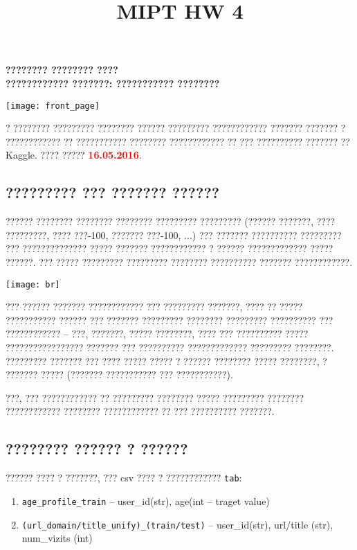 \documentclass[a4paper, 12pt]{article}
\author{}
\date{}
\title{MIPT HW 4}
\begin{document}
  \begin{center}
    \textsc{\textbf{
    	{\Large ???????? ???????? ???? \\
        \vspace{0.5cm}
    	???????????? ???????: ??????????? ????????}}}
  \end{center}

\begin{center}
	\texttt{[image: front\_page]}
\end{center}

? ???????? ????????? ???????? ?????? ????????? ???????????? ??????? ??????? ? ???????????? ?? ??????????? ???????? ???????????? ?? ??? ?????????? ??????? ?? Kaggle. ???? ????? \textbf{\textcolor{red}{16.05.2016}}.

\subsection*{????????? ??? ??????? ??????}

?????? ???????? ???????? ???????? ????????? ????????? (?????? ???????, ???? ?????????, ???? ???-100, ??????? ???-100, ...) ??? ??????? ?????????? ????????? ??? ?????????????? ????? ??????? ???????????? ? ?????? ????????????? ????? ??????. ??? ????? ????????? ????????? ???????? ?????????? ??????? ????????????. 

\begin{center}
	\texttt{[image: br]}
\end{center}

??? ?????? ??????? ???????????? ??? ????????? ???????, ???? ?? ????? ??????????? ?????? ??? ??????? ????????? ???????? ????????? ?????????? ??? ???????????? -- ???, ???????, ????? ????????, ???? ??? ?????????? ????? ????????????????? ??????? ??? ?????????? ????????????? ????????? ????????. ????????? ??????? ??? ???? ????? ????? ? ?????? ???????? ????? ????????, ? ??????? ????? (??????? ??????????? ??? ???????????). 

???, ??? ???????????? ?? ????????? ???????? ????? ????????? ???????? ???????????? ???????? ???????????? ?? ??? ?????????? ???????.

\subsection*{???????? ?????? ? ??????}

?????? ???? ? ???????, ??? csv ???? ? ???????????? \texttt{tab}:
\begin{enumerate}
	\item \texttt{age\_profile\_train} -- user\_id(str), age(int -- traget value)
    \item \texttt{(url\_domain/title\_unify)\_(train/test)} -- user\_id(str), url/title (str), num\_vizits (int)
\end{enumerate}
\end{document}
